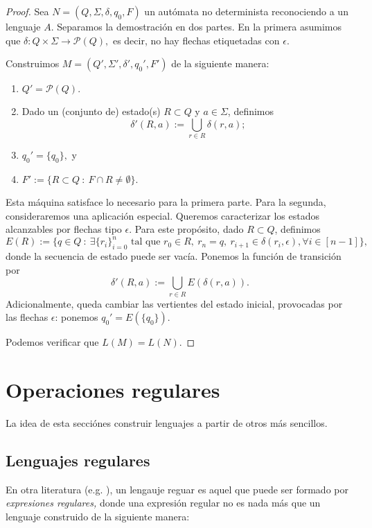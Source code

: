 \begin{proof}
    Sea \(N=(Q,\Sigma,\delta,q_0,F)\) un aut\'omata no determinista reconociendo a un lenguaje \(A.\)
    Separamos la demostraci\'on en dos partes.
    En la primera asumimos que \(\delta: Q \times \Sigma \to \mathcal{P}(Q),\) es decir, no hay flechas etiquetadas con \(\epsilon.\)

    Construimos \(M=(Q',\Sigma',\delta',q_0',F')\) de la siguiente manera:
    \begin{enumerate}
        \item \(Q'=\mathcal{P}(Q).\)
        \item Dado un (conjunto de) estado(s) \(R \subset Q\) y \(a\in\Sigma\), definimos \[\delta'(R,a):=\bigcup_{r\in R}\delta(r,a);\]
        \item \(q_0'=\{q_0\},\) y
        \item \(F':=\{R\subset Q \ : \ F\cap R \neq \emptyset\}.\)
    \end{enumerate}
    Esta m\'aquina satisface lo necesario para la primera parte. Para la segunda, consideraremos una aplicaci\'on especial. Queremos caracterizar los estados alcanzables por flechas tipo \(\epsilon.\) Para este prop\'osito, dado \(R \subset Q\), definimos \[E(R):=\{q\in Q \ : \ \exists \{r_i\}_{i=0}^n \text{ tal que } r_0\in R,\ r_n=q,\ r_{i+1}\in\delta(r_i,\epsilon), \forall i\in [n-1] \},\] donde la secuencia de estado puede ser vac\'ia.
    Ponemos la funci\'on de transici\'on por \[\delta'(R,a):=\bigcup_{r\in R}E(\delta(r,a)).\] Adicionalmente, queda cambiar las vertientes del estado inicial, provocadas por las flechas \(\epsilon\): ponemos \(q_0'=E(\{q_0\}).\)

    Podemos verificar que \(L(M)=L(N).\)
\end{proof}

\section{Operaciones regulares}

La idea de esta secci\'ones construir lenguajes a partir de otros m\'as sencillos.

\subsection{Lenguajes regulares}\label{CT1-SS-RegLang}

En otra literatura (e.g. \cite{B:Bro1989}), un lengauje reguar es aquel que puede ser formado por \emph{expresiones regulares,} donde una expresi\'on regular no es nada m\'as que un lenguaje construido de la siguiente manera:

